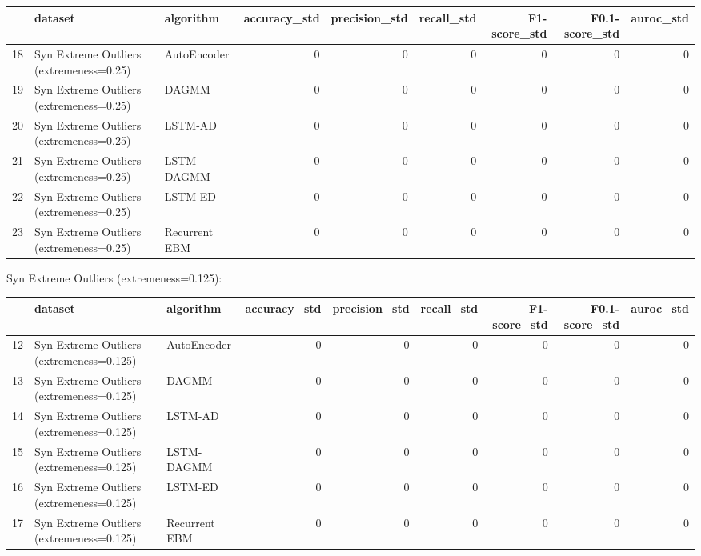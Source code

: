 \begin{tabular}{rllrrrrrr}
\hline
    & dataset                                 & algorithm     &   accuracy\_std &   precision\_std &   recall\_std &   F1-score\_std &   F0.1-score\_std &   auroc\_std \\
\hline
 18 & Syn Extreme Outliers (extremeness=0.25) & AutoEncoder   &              0 &               0 &            0 &              0 &                0 &           0 \\
 19 & Syn Extreme Outliers (extremeness=0.25) & DAGMM         &              0 &               0 &            0 &              0 &                0 &           0 \\
 20 & Syn Extreme Outliers (extremeness=0.25) & LSTM-AD       &              0 &               0 &            0 &              0 &                0 &           0 \\
 21 & Syn Extreme Outliers (extremeness=0.25) & LSTM-DAGMM    &              0 &               0 &            0 &              0 &                0 &           0 \\
 22 & Syn Extreme Outliers (extremeness=0.25) & LSTM-ED       &              0 &               0 &            0 &              0 &                0 &           0 \\
 23 & Syn Extreme Outliers (extremeness=0.25) & Recurrent EBM &              0 &               0 &            0 &              0 &                0 &           0 \\
\hline
\end{tabular}

Syn Extreme Outliers (extremeness=0.125):

\begin{tabular}{rllrrrrrr}
\hline
    & dataset                                  & algorithm     &   accuracy\_std &   precision\_std &   recall\_std &   F1-score\_std &   F0.1-score\_std &   auroc\_std \\
\hline
 12 & Syn Extreme Outliers (extremeness=0.125) & AutoEncoder   &              0 &               0 &            0 &              0 &                0 &           0 \\
 13 & Syn Extreme Outliers (extremeness=0.125) & DAGMM         &              0 &               0 &            0 &              0 &                0 &           0 \\
 14 & Syn Extreme Outliers (extremeness=0.125) & LSTM-AD       &              0 &               0 &            0 &              0 &                0 &           0 \\
 15 & Syn Extreme Outliers (extremeness=0.125) & LSTM-DAGMM    &              0 &               0 &            0 &              0 &                0 &           0 \\
 16 & Syn Extreme Outliers (extremeness=0.125) & LSTM-ED       &              0 &               0 &            0 &              0 &                0 &           0 \\
 17 & Syn Extreme Outliers (extremeness=0.125) & Recurrent EBM &              0 &               0 &            0 &              0 &                0 &           0 \\
\hline
\end{tabular}

